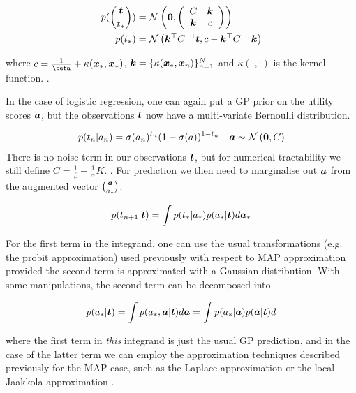 \begin{align}
p(\binom{\bm t}{t_*}) & = \mathcal{N} \left( {\bm 0}, {\left(\begin{array}{cc} C & \bm k \\ \bm k & c\end{array}\right)} \right) \\
p(t_*) & = \mathcal{N} \left( {\bm k^\top {C}^{-1} \bm t}, {c - \bm k^\top {C}^{-1} \bm k} \right)
\end{align}

where $c = \frac{1}{\beta} + \kappa (\vv{x}_*, \vv{x}_*)$, $\bm k = \{\kappa(\bm x_*, \bm x_n)\}_{n=1}^{N}$ and $\kappa(\cdot, \cdot)$ is the kernel function.
.

In the case of logistic regression, one can again put a GP prior on the utility scores $\bm a$, but the observations $\bm t$ now have a multi-variate Bernoulli distribution.

\begin{align}
p(t_n|a_n) & = \sigma(a_n)^{t_n}(1 - \sigma(a))^{1-t_n} & \bm a \sim \mathcal{N} \left( {\bm 0}, {C} \right)
\end{align}
There is no noise term in our observations $\bm t$, but for numerical tractability we still define $C=\frac{1}{\beta} + \frac{1}{\alpha}K$.
. For prediction we then need to marginalise out $\bm a$ from the augmented vector $\binom{\bm a}{a_*}$.

\begin{equation}
p(t_{n+1} | \bm t) = \int p(t_* | a_*) p (a_* | \bm t) d\bm a_*
\end{equation}

For the first term in the integrand, one can use the usual transformations (e.g. the probit approximation) used previously with respect to MAP approximation provided the second term is approximated with a Gaussian distribution. With some manipulations, the second term can be decomposed into

\begin{equation}
p(a_* | \bm t) = \int p(a_*, \bm a | \bm t) d\bm a  = \int p(a_* | \bm a) p(\bm a | \bm t) d
\end{equation}

where the first term in \emph{this} integrand is just the usual GP prediction, and in the case of the latter term we can employ the approximation techniques described previously for the MAP case, such as the Laplace approximation \cite{WilliamsBarber1998} or the local Jaakkola approximation \cite{Gibbs2000}.


